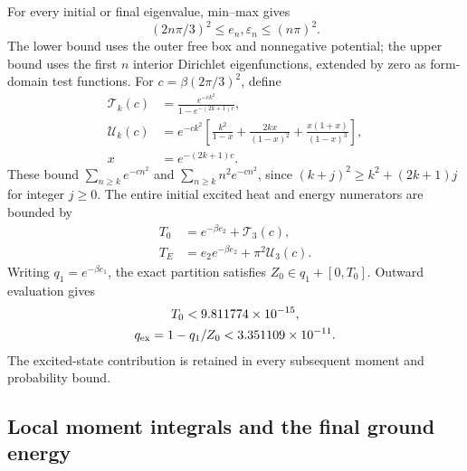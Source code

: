 \documentclass[aps,pra,reprint,superscriptaddress,longbibliography]{revtex4-2}
\begin{document}
For every initial or final eigenvalue, min--max gives
\begin{equation}
 (2n\pi/3)^2\le e_n,\varepsilon_n\le(n\pi)^2.
 \label{eq:nc-box}
\end{equation}
The lower bound uses the outer free box and nonnegative potential;
the upper bound uses the first $n$ interior Dirichlet eigenfunctions,
extended by zero as form-domain test functions.
For $c=\beta(2\pi/3)^2$, define
\begin{align}
 \mathcal T_k(c)&=\frac{e^{-ck^2}}{1-e^{-(2k+1)c}},\nonumber\\
 \mathcal U_k(c)&=e^{-ck^2}
 \left[\frac{k^2}{1-x}
       +\frac{2kx}{(1-x)^2}
       +\frac{x(1+x)}{(1-x)^3}\right],
 \nonumber\\
 x&=e^{-(2k+1)c}.
 \label{eq:nc-tails}
\end{align}
These bound $\sum_{n\ge k}e^{-cn^2}$ and
$\sum_{n\ge k}n^2e^{-cn^2}$, since
$(k+j)^2\ge k^2+(2k+1)j$ for integer $j\ge0$.
The entire initial excited heat and energy numerators are bounded by
\begin{align}
 T_0&=e^{-\beta e_2}+\mathcal T_3(c),\nonumber\\
 T_E&=e_2e^{-\beta e_2}+\pi^2\mathcal U_3(c).
 \label{eq:nc-initial-tails}
\end{align}
Writing $q_1=e^{-\beta e_1}$, the exact partition satisfies
$Z_0\in q_1+[0,T_0]$.  Outward evaluation gives
\begin{equation}
 \begin{gathered}
 T_0<9.811774\times10^{-15},\\
 q_{\rm ex}=1-q_1/Z_0<3.351109\times10^{-11}.
 \end{gathered}
 \label{eq:nc-small-tail}
\end{equation}
The excited-state contribution is retained in every subsequent
moment and probability bound.

\subsection{Local moment integrals and the final ground energy}
\end{document}
